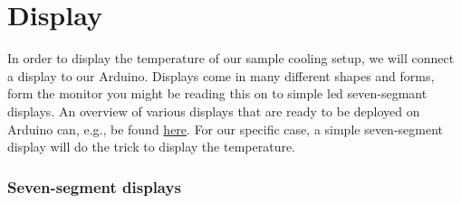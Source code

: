 
\chapter{Display}

In order to display the temperature of our sample cooling setup, we will connect a display to our Arduino. Displays come in many different shapes and forms, form the monitor you might be reading this on to simple \ac{led} seven-segmant displays. An overview of various displays that are ready to be deployed on Arduino can, e.g., be found \href{https://www.arduino.cc/reference//en/libraries/category/display/}{here}. For our specific case, a simple seven-segment display will do the trick to display the temperature.

\subsection{Seven-segment displays} 

